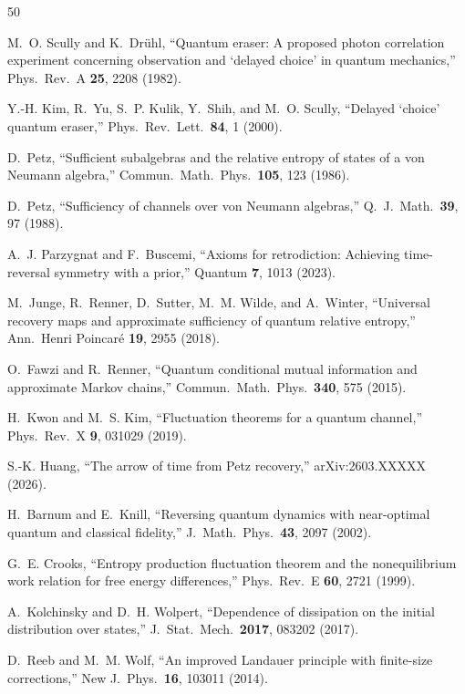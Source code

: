 \documentclass[12pt]{article}
\theoremstyle{definition}
\theoremstyle{remark}
\begin{document}
\begin{thebibliography}{50}

M.~O. Scully and K.~Dr\"uhl,
``Quantum eraser: A proposed photon correlation experiment concerning
observation and `delayed choice' in quantum mechanics,''
Phys.\ Rev.\ A \textbf{25}, 2208 (1982).

Y.-H. Kim, R.~Yu, S.~P. Kulik, Y.~Shih, and M.~O. Scully,
``Delayed `choice' quantum eraser,''
Phys.\ Rev.\ Lett.\ \textbf{84}, 1 (2000).

D.~Petz,
``Sufficient subalgebras and the relative entropy of states of a
von Neumann algebra,''
Commun.\ Math.\ Phys.\ \textbf{105}, 123 (1986).

D.~Petz,
``Sufficiency of channels over von Neumann algebras,''
Q.\ J.\ Math.\ \textbf{39}, 97 (1988).

A.~J. Parzygnat and F.~Buscemi,
``Axioms for retrodiction: Achieving time-reversal symmetry with a
prior,''
Quantum \textbf{7}, 1013 (2023).

M.~Junge, R.~Renner, D.~Sutter, M.~M. Wilde, and A.~Winter,
``Universal recovery maps and approximate sufficiency of quantum
relative entropy,''
Ann.\ Henri Poincar\'e \textbf{19}, 2955 (2018).

O.~Fawzi and R.~Renner,
``Quantum conditional mutual information and approximate Markov
chains,''
Commun.\ Math.\ Phys.\ \textbf{340}, 575 (2015).

H.~Kwon and M.~S. Kim,
``Fluctuation theorems for a quantum channel,''
Phys.\ Rev.\ X \textbf{9}, 031029 (2019).

S.-K. Huang,
``The arrow of time from Petz recovery,''
arXiv:2603.XXXXX (2026).

H.~Barnum and E.~Knill,
``Reversing quantum dynamics with near-optimal quantum and classical
fidelity,''
J.\ Math.\ Phys.\ \textbf{43}, 2097 (2002).

G.~E. Crooks,
``Entropy production fluctuation theorem and the nonequilibrium
work relation for free energy differences,''
Phys.\ Rev.\ E \textbf{60}, 2721 (1999).

A.~Kolchinsky and D.~H. Wolpert,
``Dependence of dissipation on the initial distribution over states,''
J.\ Stat.\ Mech.\ \textbf{2017}, 083202 (2017).

D.~Reeb and M.~M. Wolf,
``An improved Landauer principle with finite-size corrections,''
New J.\ Phys.\ \textbf{16}, 103011 (2014).


\end{thebibliography}
\end{document}
